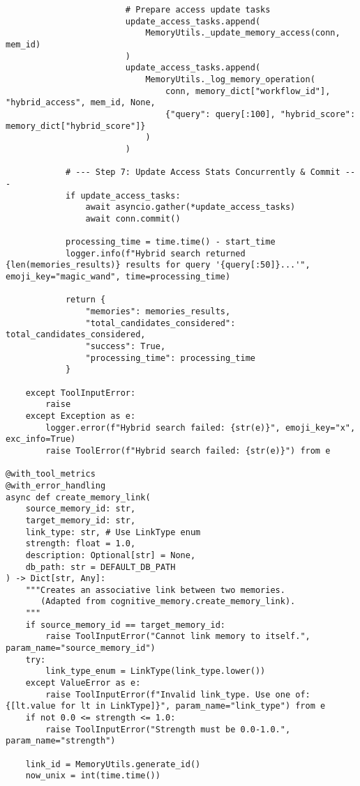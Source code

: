 \documentclass[12pt,a4paper]{article}
\begin{document}
\begin{pageablecode}
\begin{verbatim}
                        # Prepare access update tasks
                        update_access_tasks.append(
                            MemoryUtils._update_memory_access(conn, mem_id)
                        )
                        update_access_tasks.append(
                            MemoryUtils._log_memory_operation(
                                conn, memory_dict["workflow_id"], "hybrid_access", mem_id, None,
                                {"query": query[:100], "hybrid_score": memory_dict["hybrid_score"]}
                            )
                        )

            # --- Step 7: Update Access Stats Concurrently & Commit ---
            if update_access_tasks:
                await asyncio.gather(*update_access_tasks)
                await conn.commit()

            processing_time = time.time() - start_time
            logger.info(f"Hybrid search returned {len(memories_results)} results for query '{query[:50]}...'", emoji_key="magic_wand", time=processing_time)

            return {
                "memories": memories_results,
                "total_candidates_considered": total_candidates_considered,
                "success": True,
                "processing_time": processing_time
            }

    except ToolInputError:
        raise
    except Exception as e:
        logger.error(f"Hybrid search failed: {str(e)}", emoji_key="x", exc_info=True)
        raise ToolError(f"Hybrid search failed: {str(e)}") from e

@with_tool_metrics
@with_error_handling
async def create_memory_link(
    source_memory_id: str,
    target_memory_id: str,
    link_type: str, # Use LinkType enum
    strength: float = 1.0,
    description: Optional[str] = None,
    db_path: str = DEFAULT_DB_PATH
) -> Dict[str, Any]:
    """Creates an associative link between two memories.
       (Adapted from cognitive_memory.create_memory_link).
    """
    if source_memory_id == target_memory_id: 
        raise ToolInputError("Cannot link memory to itself.", param_name="source_memory_id")
    try: 
        link_type_enum = LinkType(link_type.lower())
    except ValueError as e: 
        raise ToolInputError(f"Invalid link_type. Use one of: {[lt.value for lt in LinkType]}", param_name="link_type") from e
    if not 0.0 <= strength <= 1.0: 
        raise ToolInputError("Strength must be 0.0-1.0.", param_name="strength")

    link_id = MemoryUtils.generate_id()
    now_unix = int(time.time())


\end{verbatim}
\end{pageablecode}
\end{document}

